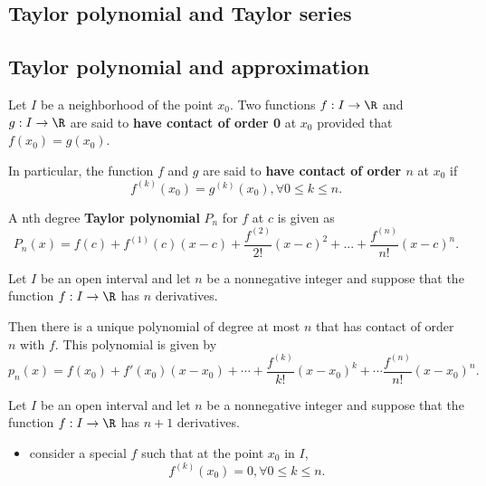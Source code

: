 \begin{refsection}
\section{Taylor polynomial and Taylor series}
\subsection{Taylor polynomial and approximation}

\begin{definition}\cite[200]{fitzpatrick2006advanced}
	Let $I$ be a neighborhood of the point $x_0$. Two functions $f:I\to \R$ and $g:I\to \R$ are said to \textbf{have contact of order 0} at $x_0$ provided that $f(x_0) = g(x_0)$.
	
	In particular, the function $f$ and $g$ are said to \textbf{have contact of order $n$} at $x_0$ if	
	$$f^{(k)}(x_0) = g^{(k)}(x_0), \forall 0\leq k\leq n.$$
\end{definition}


\begin{definition}
	A nth degree \textbf{Taylor polynomial} $P_n$ for $f$ at $c$ is given as
	$$P_n(x) = f(c) + f^{(1)}(c)(x-c) + \frac{f^{(2)}}{2!}(x-c)^2+...+\frac{f^{(n)}}{n!}(x-c)^n.$$
\end{definition}

\begin{lemma}\cite[200]{fitzpatrick2006advanced}
	Let $I$ be an open interval and let $n$ be a nonnegative integer and suppose that the function $f:I\to \R$ has $n$ derivatives.
	
	Then there is a unique polynomial of degree at most $n$ that has contact of order $n$ with $f$. This polynomial is given by
	$$p_n(x) = f(x_0) + f'(x_0)(x-x_0)+\cdots + \frac{f^{(k)}}{k!}(x-x_0)^k+\cdots \frac{f^{(n)}}{n!}(x-x_0)^n.$$ 	
\end{lemma}


\begin{theorem}\cite[186]{johnsonbaugh2010foundations}\cite[203]{fitzpatrick2006advanced}\label{ch:function-sequences-series--approximation:th:LagrangeRemainderTheorem}
	Let $I$ be an open interval and let $n$ be a nonnegative integer and suppose that the function $f:I\to \R$ has $n+1$ derivatives.
	\begin{itemize}
		\item consider a special $f$ such that at the point $x_0$ in $I$,
		$$f^{(k)}(x_0) = 0 , \forall 0\leq k\leq n. $$
		

\end{itemize}
\end{theorem}
\end{refsection}
